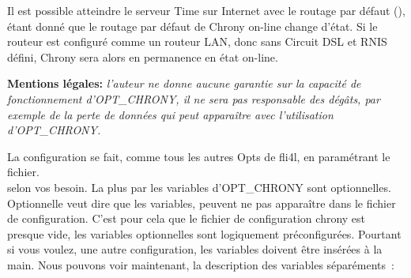 Il est possible atteindre le serveur Time sur Internet avec le routage par
défaut (), étant donné que le routage par défaut de Chrony
on-line change d'état. Si le routeur est configuré comme un routeur LAN, donc
sans Circuit DSL et RNIS défini, Chrony sera alors en permanence en état on-line.

\textbf{Mentions légales: }\emph{l'auteur ne donne aucune garantie sur la capacité
de fonctionnement d'OPT\_\-CHRONY, il ne sera pas responsable des dégâts, par
exemple de la perte de données qui peut apparaître avec l'utilisation d'OPT\_\-CHRONY.}



La configuration se fait, comme tous les autres Opts de fli4l, en paramétrant le
fichier.\\  selon vos besoin.
La plus par les variables d'OPT\_\-CHRONY sont optionnelles. Optionnelle veut dire
que les variables, peuvent ne pas apparaître dans le fichier de configuration.
C'est pour cela que le fichier de configuration chrony est presque vide, les
variables optionnelles sont logiquement préconfigurées. Pourtant si vous voulez,
une autre configuration, les variables doivent être insérées à la main. Nous 
pouvons voir maintenant, la description des variables séparéments~:

